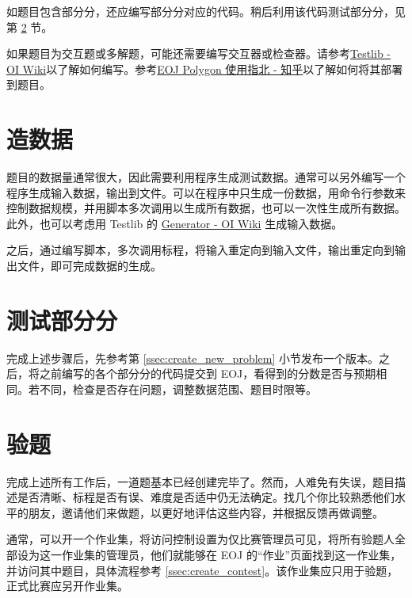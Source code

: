 \documentclass[oneside]{book}
\begin{document}
如题目包含部分分，还应编写部分分对应的代码。稍后利用该代码测试部分分，见第 
\ref{sec:test_partial_score} 节。

如果题目为交互题或多解题，可能还需要编写交互器或检查器。请参考\href{https://oi-wiki.org/tools/testlib/}{Testlib - OI Wiki}以了解如何编写。参考\href{https://zhuanlan.zhihu.com/p/59869879}{EOJ Polygon 使用指北 - 知乎}以了解如何将其部署到题目。

\section{造数据}

\label{sec:generating_data}

题目的数据量通常很大，因此需要利用程序生成测试数据。通常可以另外编写一个程序生成输入数据，输出到文件。可以在程序中只生成一份数据，用命令行参数来控制数据规模，并用脚本多次调用以生成所有数据，也可以一次性生成所有数据。此外，也可以考虑用 Testlib 的 \href{https://oi-wiki.org/tools/testlib/generator/}{Generator - OI Wiki} 生成输入数据。

之后，通过编写脚本，多次调用标程，将输入重定向到输入文件，输出重定向到输出文件，即可完成数据的生成。

\section{测试部分分}

\label{sec:test_partial_score}

完成上述步骤后，先参考第 \ref{ssec:create_new_problem} 小节发布一个版本。之后，将之前编写的各个部分分的代码提交到 EOJ，看得到的分数是否与预期相同。若不同，检查是否存在问题，调整数据范围、题目时限等。

\section{验题}

\label{sec:verify_problem}

完成上述所有工作后，一道题基本已经创建完毕了。然而，人难免有失误，题目描述是否清晰、标程是否有误、难度是否适中仍无法确定。找几个你比较熟悉他们水平的朋友，邀请他们来做题，以更好地评估这些内容，并根据反馈再做调整。

通常，可以开一个作业集，将访问控制设置为仅比赛管理员可见，将所有验题人全部设为这一作业集的管理员，他们就能够在 EOJ 的``作业''页面找到这一作业集，并访问其中题目，具体流程参考 \ref{ssec:create_contest}。该作业集应只用于验题，正式比赛应另开作业集。
\end{document}
